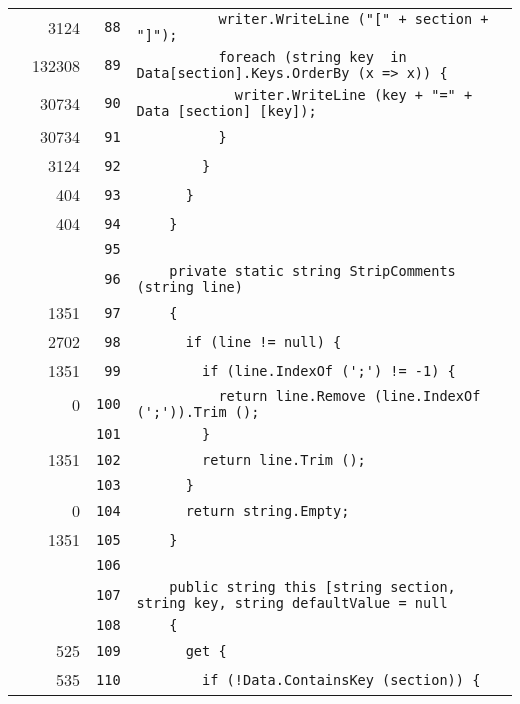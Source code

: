 \documentclass[a4paper,10pt]{article}
\begin{document}
\begin{longtable}[l]{lrrl}
\cellcolor{green} & 3124 & \verb~88~ & \verb~          writer.WriteLine ("[" + section + "]");~\\
\cellcolor{green} & 132308 & \verb~89~ & \verb~          foreach (string key  in Data[section].Keys.OrderBy (x => x)) {~\\
\cellcolor{green} & 30734 & \verb~90~ & \verb~            writer.WriteLine (key + "=" + Data [section] [key]);~\\
\cellcolor{green} & 30734 & \verb~91~ & \verb~          }~\\
\cellcolor{green} & 3124 & \verb~92~ & \verb~        }~\\
\cellcolor{green} & 404 & \verb~93~ & \verb~      }~\\
\cellcolor{green} & 404 & \verb~94~ & \verb~    }~\\
\cellcolor{gray} &  & \verb~95~ & \verb~~\\
\cellcolor{gray} &  & \verb~96~ & \verb~    private static string StripComments (string line)~\\
\cellcolor{green} & 1351 & \verb~97~ & \verb~    {~\\
\cellcolor{green} & 2702 & \verb~98~ & \verb~      if (line != null) {~\\
\cellcolor{green} & 1351 & \verb~99~ & \verb~        if (line.IndexOf (';') != -1) {~\\
\cellcolor{red} & 0 & \verb~100~ & \verb~          return line.Remove (line.IndexOf (';')).Trim ();~\\
\cellcolor{gray} &  & \verb~101~ & \verb~        }~\\
\cellcolor{green} & 1351 & \verb~102~ & \verb~        return line.Trim ();~\\
\cellcolor{gray} &  & \verb~103~ & \verb~      }~\\
\cellcolor{red} & 0 & \verb~104~ & \verb~      return string.Empty;~\\
\cellcolor{green} & 1351 & \verb~105~ & \verb~    }~\\
\cellcolor{gray} &  & \verb~106~ & \verb~~\\
\cellcolor{gray} &  & \verb~107~ & \verb~    public string this [string section, string key, string defaultValue = null~\\
\cellcolor{gray} &  & \verb~108~ & \verb~    {~\\
\cellcolor{green} & 525 & \verb~109~ & \verb~      get {~\\
\cellcolor{green} & 535 & \verb~110~ & \verb~        if (!Data.ContainsKey (section)) {~\\

\end{longtable}
\end{document}
